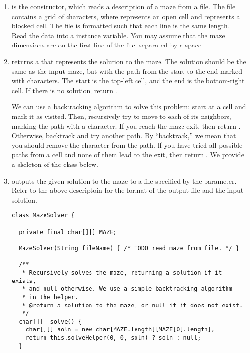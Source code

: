 
\begin{enumerate}[label=(\alph*)]
    \item {} is the constructor, which reads a description of a maze from a file. The file contains a grid of characters, where  represents an open cell and  represents a blocked cell. The file is formatted such that each line is the same length. Read the data into a  instance variable. You may assume that the maze dimensions are on the first line of the file, separated by a space.

    \item {} returns a  that represents the solution to the maze. The solution should be the same as the input maze, but with the path from the start to the end marked with  characters. The start is the top-left cell, and the end is the bottom-right cell. If there is no solution, return .

    We can use a backtracking algorithm to solve this problem: start at a cell and mark it as visited. Then, recursively try to move to each of its neighbors, marking the path with a  character. If you reach the maze exit, then return . Otherwise, backtrack and try another path. By ``backtrack,'' we mean that you should remove the  character from the path. If you have tried all possible paths from a cell and none of them lead to the exit, then return . We provide a skeleton of the class below.

    \item {} outputs the given solution to the maze to a file specified by the parameter. Refer to the above descriptoin for the format of the output file and the input  solution.

\begin{lstlisting}[language=MyJava]
class MazeSolver {

  private final char[][] MAZE;

  MazeSolver(String fileName) { /* TODO read maze from file. */ }

  /**
   * Recursively solves the maze, returning a solution if it exists, 
   * and null otherwise. We use a simple backtracking algorithm 
   * in the helper.
   * @return a solution to the maze, or null if it does not exist.
   */
  char[][] solve() {
    char[][] soln = new char[MAZE.length][MAZE[0].length];
    return this.solveHelper(0, 0, soln) ? soln : null;
  }


\end{lstlisting}
\end{enumerate}
